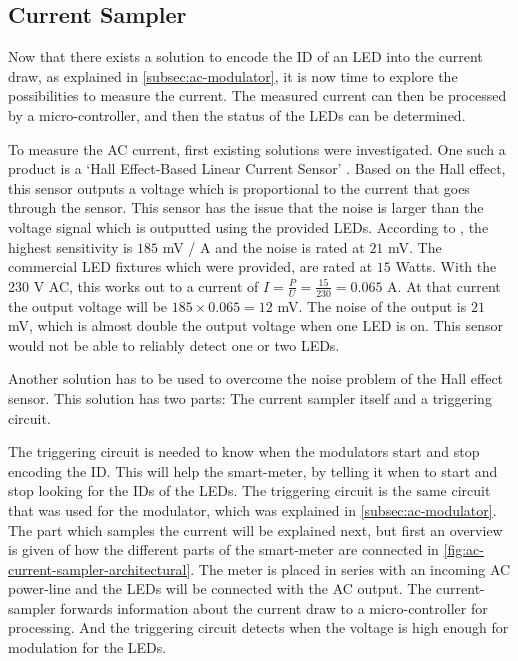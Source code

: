 

\subsection{Current Sampler}
\label{subsec:ac-current-sampler}


Now that there exists a solution to encode the ID of an LED into the current draw, as explained in \autoref{subsec:ac-modulator}, it is now time to explore the possibilities to measure the current.
The measured current can then be processed by a micro-controller, and then the status of the LEDs can be determined.


To measure the AC current, first existing solutions were investigated.
One such a product is a `Hall Effect-Based Linear Current Sensor' \cite{hall-ac-current-sensor-datasheet}.
Based on the Hall effect, this sensor outputs a voltage which is proportional to the current that goes through the sensor.
This sensor has the issue that the noise is larger than the voltage signal which is outputted using the provided LEDs.
According to \cite{hall-ac-current-sensor-datasheet}, the highest sensitivity is $185$ mV / A and the noise is rated at $21$ mV.
The commercial LED fixtures which were provided, are rated at $15$ Watts.
With the 230 V AC, this works out to a current of $I = \frac{P}{U} = \frac{15}{230} = 0.065$ A.
At that current the output voltage will be $185 \times 0.065 = 12$ mV.
The noise of the output is $21$ mV, which is almost double the output voltage when one LED is on.
This sensor would not be able to reliably detect one or two LEDs.



Another solution has to be used to overcome the noise problem of the Hall effect sensor.
This solution has two parts: The current sampler itself and a triggering circuit.

The triggering circuit is needed to know when the modulators start and stop encoding the ID.
This will help the smart-meter, by telling it when to start and stop looking for the IDs of the LEDs.
The triggering circuit is the same circuit that was used for the modulator, which was explained in \autoref{subsec:ac-modulator}.
The part which samples the current will be explained next, but first an overview is given of how the different parts of the smart-meter are connected in \autoref{fig:ac-current-sampler-architectural}.
The meter is placed in series with an incoming AC power-line and the LEDs will be connected with the AC output.
The current-sampler forwards information about the current draw to a micro-controller for processing.
And the triggering circuit detects when the voltage is high enough for modulation for the LEDs. 



